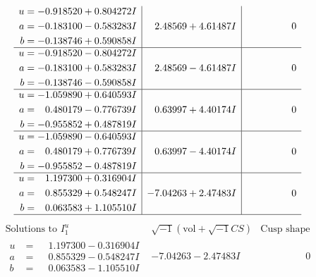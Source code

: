 \documentclass[1p]{elsarticle_modified}
\theoremstyle{definition}
\newcommand{\I}{\sqrt{-1}}
\begin{document}
$$\begin{array}{c|c|c}
\begin{aligned}
u &= -0.918520 + 0.804272 I \\
a &= -0.183100 - 0.583283 I \\
b &= -0.138746 + 0.590858 I\end{aligned}
 & \phantom{-}2.48569 + 4.61487 I & \phantom{-0.000000 } 0 \\ \hline\begin{aligned}
u &= -0.918520 - 0.804272 I \\
a &= -0.183100 + 0.583283 I \\
b &= -0.138746 - 0.590858 I\end{aligned}
 & \phantom{-}2.48569 - 4.61487 I & \phantom{-0.000000 } 0 \\ \hline\begin{aligned}
u &= -1.059890 + 0.640593 I \\
a &= \phantom{-}0.480179 - 0.776739 I \\
b &= -0.955852 + 0.487819 I\end{aligned}
 & \phantom{-}0.63997 + 4.40174 I & \phantom{-0.000000 } 0 \\ \hline\begin{aligned}
u &= -1.059890 - 0.640593 I \\
a &= \phantom{-}0.480179 + 0.776739 I \\
b &= -0.955852 - 0.487819 I\end{aligned}
 & \phantom{-}0.63997 - 4.40174 I & \phantom{-0.000000 } 0 \\ \hline\begin{aligned}
u &= \phantom{-}1.197300 + 0.316904 I \\
a &= \phantom{-}0.855329 + 0.548247 I \\
b &= \phantom{-}0.063583 + 1.105510 I\end{aligned}
 & -7.04263 + 2.47483 I & \phantom{-0.000000 } 0\\
 \hline 
 \end{array}$$\newpage$$\begin{array}{c|c|c}  
\text{Solutions to }I^u_{1}& \I (\text{vol} + \sqrt{-1}CS) & \text{Cusp shape}\\
 \hline 
\begin{aligned}
u &= \phantom{-}1.197300 - 0.316904 I \\
a &= \phantom{-}0.855329 - 0.548247 I \\
b &= \phantom{-}0.063583 - 1.105510 I\end{aligned}
 & -7.04263 - 2.47483 I & \phantom{-0.000000 } 0 \\ \hline\begin{aligned}

\end{aligned}
\end{array}$$
\end{document}

